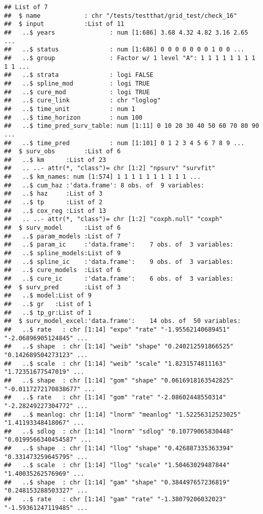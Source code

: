 \documentclass[
]{article}
\begin{document}
\begin{verbatim}
## List of 7
##  $ name            : chr "/tests/testthat/grid_test/check_16"
##  $ input           :List of 11
##   ..$ years               : num [1:686] 3.68 4.32 4.82 3.16 2.65 ...
##   ..$ status              : num [1:686] 0 0 0 0 0 0 0 1 0 0 ...
##   ..$ group               : Factor w/ 1 level "A": 1 1 1 1 1 1 1 1 1 1 ...
##   ..$ strata              : logi FALSE
##   ..$ spline_mod          : logi TRUE
##   ..$ cure_mod            : logi TRUE
##   ..$ cure_link           : chr "loglog"
##   ..$ time_unit           : num 1
##   ..$ time_horizon        : num 100
##   ..$ time_pred_surv_table: num [1:11] 0 10 20 30 40 50 60 70 80 90 ...
##   ..$ time_pred           : num [1:101] 0 1 2 3 4 5 6 7 8 9 ...
##  $ surv_obs        :List of 6
##   ..$ km      :List of 23
##   .. ..- attr(*, "class")= chr [1:2] "npsurv" "survfit"
##   ..$ km_names: num [1:574] 1 1 1 1 1 1 1 1 1 1 ...
##   ..$ cum_haz :'data.frame': 8 obs. of  9 variables:
##   ..$ haz     :List of 3
##   ..$ tp      :List of 2
##   ..$ cox_reg :List of 13
##   .. ..- attr(*, "class")= chr [1:2] "coxph.null" "coxph"
##  $ surv_model      :List of 6
##   ..$ param_models :List of 7
##   ..$ param_ic     :'data.frame':    7 obs. of  3 variables:
##   ..$ spline_models:List of 9
##   ..$ spline_ic    :'data.frame':    9 obs. of  3 variables:
##   ..$ cure_models  :List of 6
##   ..$ cure_ic      :'data.frame':    6 obs. of  3 variables:
##  $ surv_pred       :List of 3
##   ..$ model:List of 9
##   ..$ gr   :List of 1
##   ..$ tp_gr:List of 1
##  $ surv_model_excel:'data.frame':    14 obs. of  50 variables:
##   ..$ rate   : chr [1:14] "expo" "rate" "-1.95562140689451" "-2.06896905124845" ...
##   ..$ shape  : chr [1:14] "weib" "shape" "0.240212591866525" "0.142689504273123" ...
##   ..$ scale  : chr [1:14] "weib" "scale" "1.8231574811163" "1.72351677547019" ...
##   ..$ shape  : chr [1:14] "gom" "shape" "0.0616918163542825" "-0.0117272170838677" ...
##   ..$ rate   : chr [1:14] "gom" "rate" "-2.08602448550314" "-2.28249227304772" ...
##   ..$ meanlog: chr [1:14] "lnorm" "meanlog" "1.52256312523025" "1.41193348418067" ...
##   ..$ sdlog  : chr [1:14] "lnorm" "sdlog" "0.10779065830448" "0.0199566340454587" ...
##   ..$ shape  : chr [1:14] "llog" "shape" "0.426887335363394" "0.331473259645795" ...
##   ..$ scale  : chr [1:14] "llog" "scale" "1.50463029487844" "1.40035262576969" ...
##   ..$ shape  : chr [1:14] "gam" "shape" "0.384497657236819" "0.248153288503327" ...
##   ..$ rate   : chr [1:14] "gam" "rate" "-1.38079206032023" "-1.59361247119485" ...

\end{verbatim}
\end{document}
